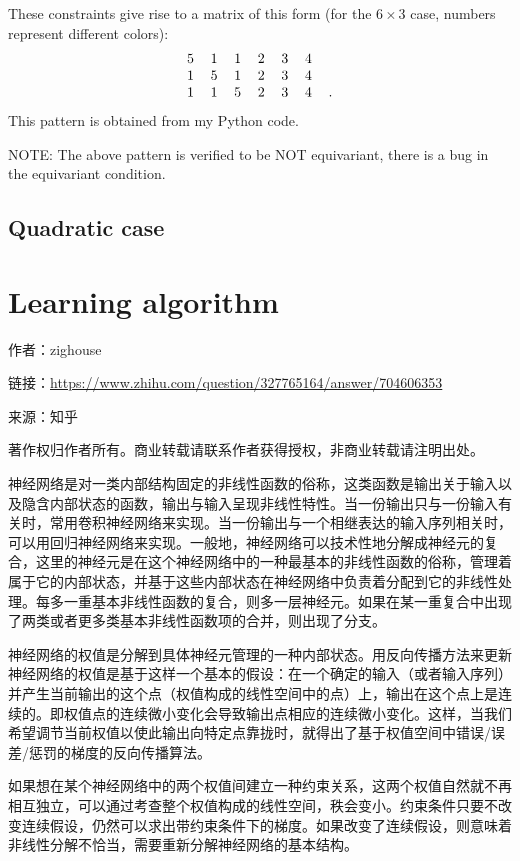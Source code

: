 These constraints give rise to a matrix of this form (for the $6 \times 3$ case, numbers represent different colors):
\begin{equation}
\begin{tabular}{c c c c c c c}
5 & 1 & 1 & 2 & 3 & 4 & \\
1 & 5 & 1 & 2 & 3 & 4 & \\
1 & 1 & 5 & 2 & 3 & 4 & .
\end{tabular} 
\end{equation}This pattern is obtained from my Python code.

NOTE:  The above pattern is verified to be NOT equivariant, there is a bug in the equivariant condition.

\subsection{Quadratic case}

\section{Learning algorithm}

作者：zighouse

链接：\url{https://www.zhihu.com/question/327765164/answer/704606353}

来源：知乎

著作权归作者所有。商业转载请联系作者获得授权，非商业转载请注明出处。

神经网络是对一类内部结构固定的非线性函数的俗称，这类函数是输出关于输入以及隐含内部状态的函数，输出与输入呈现非线性特性。当一份输出只与一份输入有关时，常用卷积神经网络来实现。当一份输出与一个相继表达的输入序列相关时，可以用回归神经网络来实现。一般地，神经网络可以技术性地分解成神经元的复合，这里的神经元是在这个神经网络中的一种最基本的非线性函数的俗称，管理着属于它的内部状态，并基于这些内部状态在神经网络中负责着分配到它的非线性处理。每多一重基本非线性函数的复合，则多一层神经元。如果在某一重复合中出现了两类或者更多类基本非线性函数项的合并，则出现了分支。

神经网络的权值是分解到具体神经元管理的一种内部状态。用反向传播方法来更新神经网络的权值是基于这样一个基本的假设：在一个确定的输入（或者输入序列）并产生当前输出的这个点（权值构成的线性空间中的点）上，输出在这个点上是连续的。即权值点的连续微小变化会导致输出点相应的连续微小变化。这样，当我们希望调节当前权值以使此输出向特定点靠拢时，就得出了基于权值空间中错误/误差/惩罚的梯度的反向传播算法。

如果想在某个神经网络中的两个权值间建立一种约束关系，这两个权值自然就不再相互独立，可以通过考查整个权值构成的线性空间，秩会变小。约束条件只要不改变连续假设，仍然可以求出带约束条件下的梯度。如果改变了连续假设，则意味着非线性分解不恰当，需要重新分解神经网络的基本结构。


